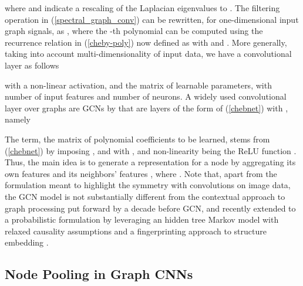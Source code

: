 \documentclass[runningheads]{llncs}
\begin{document}
where  and  indicate a rescaling of the Laplacian eigenvalues to . The filtering operation in (\ref{spectral_graph_conv}) can be rewritten, for one-dimensional input graph signals, as , where the -th polynomial  can be computed using the recurrence relation in (\ref{cheby-poly}) now defined as  with  and . More generally, taking into account multi-dimensionality of input data, we have a convolutional layer as follows

with  a non-linear activation, and  the matrix of learnable parameters, with  number of input features and  number of neurons. A widely used convolutional layer over graphs are GCNs by \cite{DBLP:journals/corr/KipfW16} that are layers of the form of (\ref{chebnet}) with , namely


The  term, the matrix of polynomial coefficients to be learned, stems from (\ref{chebnet}) by imposing , and with , and non-linearity being the ReLU function \cite{DBLP:journals/corr/KipfW16}. Thus, the main idea is to generate a representation for a node  by aggregating its own features  and its neighbors’ features , where .
Note that, apart from the formulation meant to highlight the symmetry with convolutions on image data, the GCN model is not substantially different from the contextual approach to graph processing put forward by \cite{micheli} a decade before GCN, and recently extended to a probabilistic formulation \cite{pmlr-v80-bacciu18a} by leveraging an hidden tree Markov model \cite{gtmsd} with relaxed causality assumptions and a fingerprinting approach to structure embedding \cite{tnnlsKernel}.

\subsection{Node Pooling in Graph CNNs}
\end{document}
